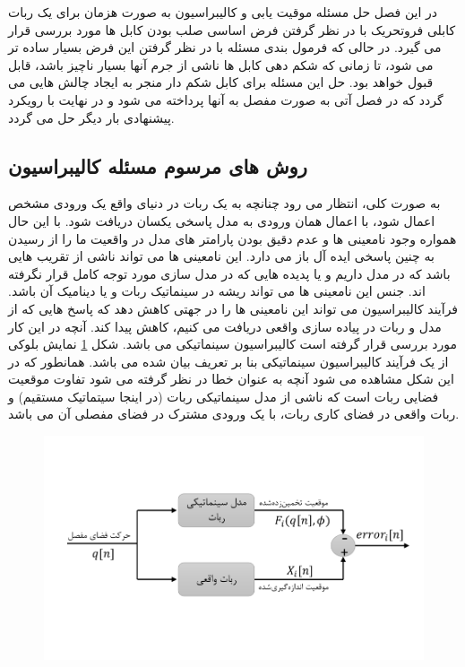 در این فصل حل مسئله موقیت یابی و کالیبراسیون به صورت هزمان برای یک ربات کابلی فروتحریک با در نظر گرفتن فرض اساسی صلب بودن کابل ها مورد بررسی قرار می گیرد. در حالی که فرمول بندی مسئله با در نظر گرفتن این فرض بسیار ساده تر می شود، تا زمانی که شکم دهی کابل ها ناشی از جرم آنها بسیار ناچیز باشد، قابل قبول خواهد بود. حل این مسئله برای کابل شکم دار منجر به ایجاد چالش هایی می گردد که در فصل آتی به صورت مفصل به آنها پرداخته می شود و در نهایت با رویکرد پیشنهادی بار دیگر حل می گردد. 

\subsection{روش های مرسوم مسئله کالیبراسیون} \label{seq:conventional_calibration}
به صورت کلی، انتظار می رود چنانچه به یک ربات در دنیای واقع یک ورودی مشخص اعمال شود، با اعمال همان ورودی به مدل پاسخی یکسان دریافت شود. با این حال همواره وجود نامعینی ها و عدم دقیق بودن پارامتر های مدل در واقعیت ما را از رسیدن به چنین پاسخی ایده آل باز می دارد. این نامعینی ها می تواند ناشی از تقریب هایی باشد که در مدل داریم و یا پدیده هایی که در مدل سازی مورد توجه کامل قرار نگرفته اند. جنس این نامعینی ها می تواند ریشه در سینماتیک ربات و یا دینامیک آن باشد. فرآیند کالیبراسیون می تواند این نامعینی ها را در جهتی کاهش دهد که پاسخ هایی که از مدل و ربات در پیاده سازی واقعی دریافت می کنیم، کاهش پیدا کند. آنچه در این کار مورد بررسی قرار گرفته است کالیبراسیون سینماتیکی می باشد. شکل \ref{fig:kinematicmodelerror} نمایش بلوکی از یک فرآیند کالیبراسیون سینماتیکی بنا بر تعریف بیان شده می باشد. همانطور که در این شکل مشاهده می شود آنچه به عنوان خطا در نظر گرفته می شود تفاوت موقعیت فضایی ربات است که ناشی از مدل سینماتیکی ربات (در اینجا سیتماتیک مستقیم) و ربات واقعی در فضای کاری ربات، با یک ورودی مشترک در فضای مفصلی آن می باشد. 

\begin{figure}[!t]
	\centering
	\includegraphics[width=0.8\linewidth, trim={0cm 2.2cm 0cm 2.2cm}, clip]{img/kinematic_model_error}
	\caption{}
	\label{fig:kinematicmodelerror}
\end{figure}



